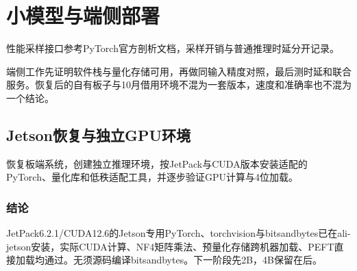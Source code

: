 \chapter{小模型与端侧部署}
性能采样接口参考PyTorch官方剖析文档\cite{profiler}，采样开销与普通推理时延分开记录。


端侧工作先证明软件栈与量化存储可用，再做同输入精度对照，最后测时延和联合服务。恢复后的自有板子与10月借用环境不混为一套版本，速度和准确率也不混为一个结论。

\section{Jetson恢复与独立GPU环境}

\label{stage:s21}

恢复板端系统，创建独立推理环境，按JetPack与CUDA版本安装适配的PyTorch、量化库和低秩适配工具，并逐步验证GPU计算与4位加载。

\subsection{结论}\label{s21-detail-1}

JetPack6.2.1/CUDA12.6的Jetson专用PyTorch、torchvision与bitsandbytes已在ali-jetson安装，实际CUDA计算、NF4矩阵乘法、预量化存储跨机器加载、PEFT直接加载均通过。无须源码编译bitsandbytes。下一阶段先2B，4B保留在后。

